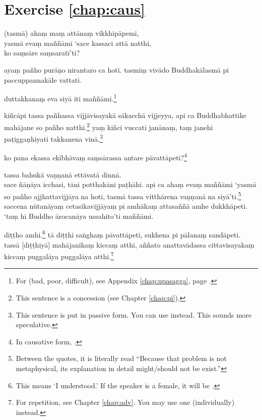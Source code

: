 \section*{Exercise \ref{chap:caus}}
\begin{answerkey}
\item (tasm\=a) aha\d m ma\d m att\=ana\d m vikkhip\=apemi, \\yasm\=a eva\d m ma\~n\~n\=ami `sace kassaci att\=a natthi, \\ko sa\d ms\=are sa\d msarat\=i'ti?
\item aya\d m pa\~nho pur\=a\d no nirantaro ca hoti. tasmi\d m viv\=ado Buddhak\=alasm\=a pi paccuppannak\=ale vattati.
\item duttakkana\d m eva siy\=a iti ma\~n\~n\=ami.\footnote{For  (bad, poor, difficult), see Appendix \ref{chap:upasagga}, page \pageref{upasagga:du}.}
\item ki\~nc\=api tassa pa\~nhassa vijj\=avisayak\=a s\=akacch\=a vijjeyya, api ca Buddhabhattike mah\=ajane so pa\~nho natthi.\footnote{This sentence is a concession (see Chapter \ref{chap:pi}).} ya\d m ki\~nci vuccati jan\=ana\d m, ta\d m janehi pa\d tigga\d nhiyati takkanena vin\=a.\footnote{This sentence is put in passive form. You can use  instead. This sounds more speculative.}
\item ko pana ekassa ek\=ibh\=ava\d m sa\d ms\=arassa antare p\=avatt\=apeti?\footnote{In causative form, .}
\item tassa bahuk\=a va\d n\d nan\=a ett\=avat\=a dinn\=a. \\sace \~n\=a\d n\=aya icchasi, t\=ani potthak\=ani pa\d th\=ahi. api ca aha\d m eva\d m ma\~n\~n\=ami `yasm\=a so pa\~nho ajjhattavijj\=aya na hoti, tasm\=a tassa vitth\=arena va\d n\d nan\=a na siy\=a'ti.\footnote{Between the quotes, it is literally read ``Because that problem is not metaphysical, its explanation in detail might/should not be exist.''} \\saccena n\=utan\=aya\d m cetasikavijj\=aya\d m pi amh\=aka\d m attasa\~n\~n\=a amhe dukkh\=apeti. `ta\d m hi Buddho \=arocan\=aya ussahito'ti ma\~n\~n\=ami.
\item di\d t\d tho amhi.\footnote{This means `I understood.' If the speaker is a female, it will be .} t\=a di\d t\d thi sa\.ngha\d m p\=avatt\=apeti, sukhena pi p\=alana\d m sand\=apeti. tass\=a [di\d t\d thiy\=a] mah\=ajanika\d m kicca\d m atthi, a\~n\~nato anattav\=adassa cittavisayaka\d m kicca\d m puggal\=aya puggal\=aya atthi.\footnote{For repetition, see Chapter \ref{chap:adv}. You may use one  (individually) instead.}
\end{answerkey}

